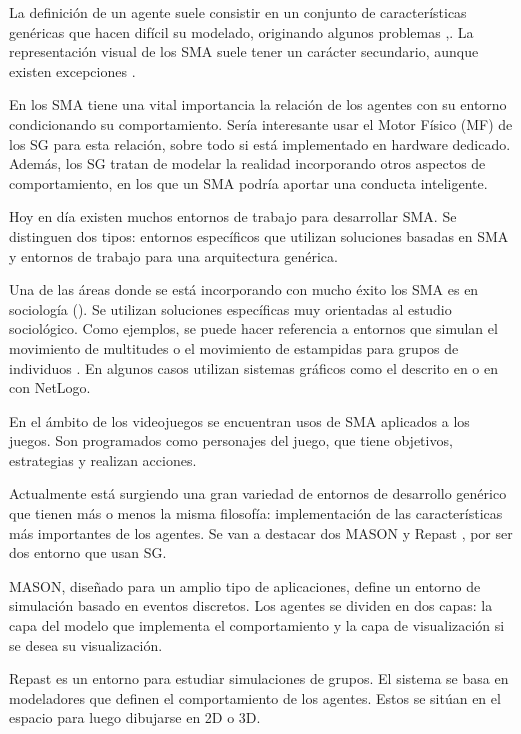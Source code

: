 \documentclass[runningheads]{llncs}
\begin{document}
La definici\'on de un agente suele consistir en un conjunto de caracter\'isticas gen\'ericas \cite{Gilbert2008} que hacen dif\'icil su modelado, originando algunos problemas \cite{Axelrod1997},\cite{Gilbert2008}. La representaci\'on visual de los SMA suele tener un car\'acter secundario, aunque existen excepciones \cite{Luke2005,North2005,Wilensky1999}.

En los SMA tiene una vital importancia la relaci\'on de los agentes con su entorno condicionando su comportamiento. Ser\'ia interesante usar el Motor F\'isico (MF) de los SG para esta relaci\'on, sobre todo si est\'a implementado en hardware dedicado. Adem\'as, los SG tratan de modelar la realidad incorporando otros aspectos de comportamiento, en los que un SMA podr\'ia aportar una conducta inteligente.

Hoy en d\'ia existen muchos entornos de trabajo para desarrollar SMA. Se distinguen dos tipos: entornos espec\'ificos que utilizan soluciones basadas en SMA y entornos de trabajo para una arquitectura gen\'erica.

Una de las \'areas donde se est\'a incorporando con mucho \'exito los SMA es en sociolog\'ia (\cite{Axelrod1997,Drogoul,Gilbert2008,Sawyer2005}). Se utilizan soluciones espec\'ificas muy orientadas al estudio sociol\'ogico. Como ejemplos, se puede hacer referencia a entornos que simulan el movimiento de multitudes \cite{Olfati2004,Reynolds2000,Ulicny2001} o el movimiento de estampidas para grupos de individuos \cite{Reynolds2000}. En algunos casos utilizan sistemas gr\'aficos como el descrito en \cite{Reynolds2000} o en \cite{Wilensky1999} con NetLogo.

En el \'ambito de los videojuegos se encuentran usos de SMA aplicados a los juegos\cite{Khoo2002}. Son programados como personajes del juego, que tiene objetivos, estrategias y realizan acciones.

Actualmente est\'a surgiendo una gran variedad de entornos de desarrollo gen\'erico que tienen m\'as o menos la misma filosof\'ia: implementaci\'on de las caracter\'isticas m\'as importantes de los agentes. Se van a destacar dos MASON \cite{Luke2005} y Repast \cite{North2005}, por ser dos entorno que usan SG.

MASON, dise\~{n}ado para un amplio tipo de aplicaciones, define un entorno de simulaci\'on basado en eventos discretos. Los agentes se dividen en dos capas: la capa del modelo que implementa el comportamiento y la capa de visualizaci\'on si se desea su visualizaci\'on.

Repast es un entorno para estudiar simulaciones de grupos. El sistema se basa en modeladores que definen el comportamiento de los agentes. Estos se sit\'uan en el espacio para luego dibujarse en 2D o 3D.
\end{document}
